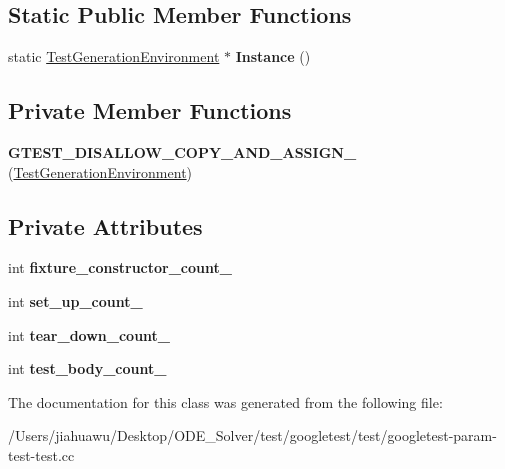 \subsection*{Static Public Member Functions}
\begin{DoxyCompactItemize}
\item 
\mbox{\label{class_test_generation_environment_a5b8e14f430fe11d558c0e4482cebd694}} 
static \mbox{\hyperlink{class_test_generation_environment}{Test\+Generation\+Environment}} $\ast$ {\bfseries Instance} ()
\end{DoxyCompactItemize}
\subsection*{Private Member Functions}
\begin{DoxyCompactItemize}
\item 
\mbox{\label{class_test_generation_environment_a995321b3007e0b271b14b238dd3cb9bd}} 
{\bfseries G\+T\+E\+S\+T\+\_\+\+D\+I\+S\+A\+L\+L\+O\+W\+\_\+\+C\+O\+P\+Y\+\_\+\+A\+N\+D\+\_\+\+A\+S\+S\+I\+G\+N\+\_\+} (\mbox{\hyperlink{class_test_generation_environment}{Test\+Generation\+Environment}})
\end{DoxyCompactItemize}
\subsection*{Private Attributes}
\begin{DoxyCompactItemize}
\item 
\mbox{\label{class_test_generation_environment_a106c1554fde078d47a535694a2c700e7}} 
int {\bfseries fixture\+\_\+constructor\+\_\+count\+\_\+}
\item 
\mbox{\label{class_test_generation_environment_a026dbcdb993a8510dbfea85ad71eab8a}} 
int {\bfseries set\+\_\+up\+\_\+count\+\_\+}
\item 
\mbox{\label{class_test_generation_environment_a2b3d02a53e98a72516430d98fd8931ef}} 
int {\bfseries tear\+\_\+down\+\_\+count\+\_\+}
\item 
\mbox{\label{class_test_generation_environment_a7d1ce26e381894b72d2ca7f4630914fa}} 
int {\bfseries test\+\_\+body\+\_\+count\+\_\+}
\end{DoxyCompactItemize}


The documentation for this class was generated from the following file\+:\begin{DoxyCompactItemize}
\item 
/\+Users/jiahuawu/\+Desktop/\+O\+D\+E\+\_\+\+Solver/test/googletest/test/googletest-\/param-\/test-\/test.\+cc\end{DoxyCompactItemize}
